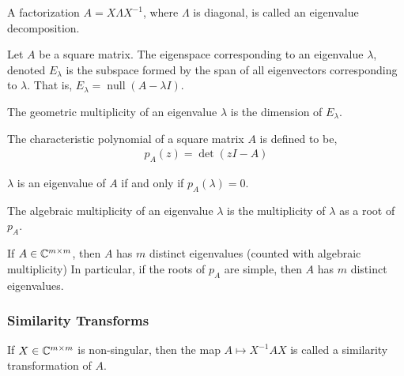 \documentclass[12pt]{article}
\begin{document}
\begin{definition}
A factorization \( A = X\Lambda X^{-1} \), where \( \Lambda \) is diagonal, is called an eigenvalue decomposition.
\end{definition}

\begin{definition}[Eigenspace]
Let \( A \) be a square matrix. The eigenspace corresponding to an eigenvalue \( \lambda \), denoted \( E_\lambda \) is the subspace formed by the span of all eigenvectors corresponding to \( \lambda \). That is, \( E_\lambda = \operatorname{null}(A-\lambda I) \).
\end{definition}

\begin{definition}
The geometric multiplicity of an eigenvalue \( \lambda \) is the dimension of \( E_\lambda \).
\end{definition}

\begin{definition}
The characteristic polynomial of a square matrix \( A \) is defined to be,
\begin{align*}
    p_A(z) =  \det(zI-A)
\end{align*}
\end{definition}

\begin{theorem}
\( \lambda \) is an eigenvalue of \( A \) if and only if \( p_A(\lambda)=0 \).
\end{theorem}

\begin{definition}
The algebraic multiplicity of an eigenvalue \( \lambda \) is the multiplicity of \( \lambda \) as a root of \( p_A \).
\end{definition}

\begin{theorem}
If \( A\in\mathbb{C}^{m\times m} \), then \( A \) has \( m \) distinct eigenvalues (counted with algebraic multiplicity) In particular, if the roots of \( p_A \) are simple, then \( A \) has \( m \) distinct eigenvalues.
\end{theorem}

\subsubsection{Similarity Transforms}
\begin{definition}
If \( X\in \mathbb{C}^{m\times m} \) is non-singular, then the map \( A \mapsto X^{-1}AX \) is called a similarity transformation of \( A \).
\end{definition}
\end{document}
